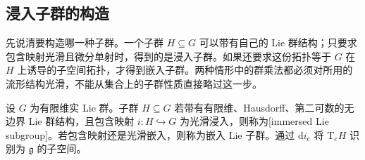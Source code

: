 \subsection{浸入子群的构造}
\label{g1:subsec:1603:02}

先说清要构造哪一种子群。一个子群 \(H\subseteq G\) 可以带有自己的 Lie 群结构；只要求包含映射光滑且微分单射时，得到的是浸入子群。如果还要求这份拓扑等于 \(G\) 在 \(H\) 上诱导的子空间拓扑，才得到嵌入子群。两种情形中的群乘法都必须对所用的流形结构光滑，不能从集合上的子群性质直接略过这一步。

\begin{definition}\label{g1:def:immersed-lie-subgroup}
	设 \(G\) 为有限维实 Lie 群。子群 \(H\subseteq G\) 若带有有限维、Hausdorff、第二可数的无边界 Lie 群结构，且包含映射 \(i:H\hookrightarrow G\) 为光滑浸入，则称为[immersed Lie subgroup]。若包含映射还是光滑嵌入，则称为嵌入 Lie 子群。通过 \(\mathrm{d}i_e\) 将 \(\mathrm{T}_eH\) 识别为 \(\mathfrak g\) 的子空间。
\end{definition}

